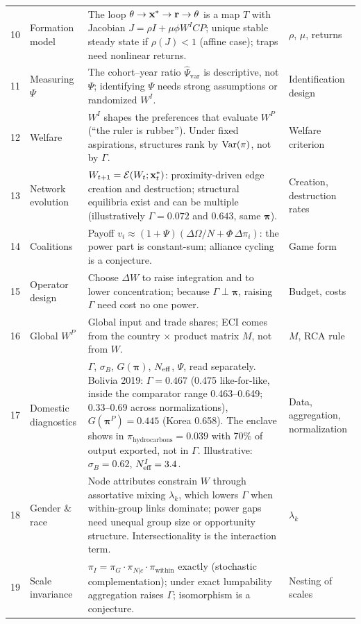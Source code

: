 \documentclass[../structural_economics_book.tex]{subfiles}
\begin{document}
{\begin{longtable}{@{}r>{\raggedright\arraybackslash}p{2.5cm}>{\raggedright\arraybackslash}p{7.6cm}>{\raggedright\arraybackslash}p{3.1cm}@{}}
10 & Formation model & The loop $\theta \to \mathbf{x}^* \to \mathbf{r} \to \theta$ is a map $T$ with Jacobian $J = \rho I + \mu\phi W^I C P$; unique stable steady state if $\rho(J) < 1$ (affine case); traps need nonlinear returns. & $\rho$, $\mu$, returns \\
11 & Measuring $\Psi$ & The cohort--year ratio $\hat{\Psi}_{\text{var}}$ is descriptive, not $\Psi$; identifying $\Psi$ needs strong assumptions or randomized $W^I$. & Identification design \\
12 & Welfare & $W^I$ shapes the preferences that evaluate $W^P$ (``the ruler is rubber''). Under fixed aspirations, structures rank by $\operatorname{Var}(\pi)$, not by $\Gamma$. & Welfare criterion \\
13 & Network evolution & $W_{t+1} = \mathcal{E}(W_t; \mathbf{x}^*_t)$: proximity-driven edge creation and destruction; structural equilibria exist and can be multiple (illustratively $\Gamma = 0.072$ and $0.643$, same $\boldsymbol{\pi}$). & Creation, destruction rates \\
14 & Coalitions & Payoff $v_i \approx (1+\Psi)(\Delta\Omega/N + \Phi\,\Delta\pi_i)$: the power part is constant-sum; alliance cycling is a conjecture. & Game form \\
15 & Operator design & Choose $\Delta W$ to raise integration and to lower concentration; because $\Gamma \perp \boldsymbol{\pi}$, raising $\Gamma$ need cost no one power. & Budget, costs \\
16 & Global $W^P$ & Global input and trade shares; ECI comes from the country $\times$ product matrix $M$, not from $W$. & $M$, RCA rule \\
17 & Domestic diagnostics & $\Gamma$, $\sigma_B$, $G(\boldsymbol{\pi})$, $N_{\text{eff}}$, $\Psi$, read separately. Bolivia 2019: $\Gamma = 0.467$ (0.475 like-for-like, inside the comparator range 0.463--0.649; 0.33--0.69 across normalizations), $G(\boldsymbol{\pi}^P) = 0.445$ (Korea 0.658). The enclave shows in $\pi_{\text{hydrocarbons}} = 0.039$ with 70\% of output exported, not in $\Gamma$. Illustrative: $\sigma_B = 0.62$, $N_{\text{eff}}^I = 3.4$. & Data, aggregation, normalization \\
18 & Gender \& race & Node attributes constrain $W$ through assortative mixing $\lambda_k$, which lowers $\Gamma$ when within-group links dominate; power gaps need unequal group size or opportunity structure. Intersectionality is the interaction term. & $\lambda_k$ \\
19 & Scale invariance & $\pi_I = \pi_G \cdot \pi_{N|c} \cdot \pi_{\text{within}}$ exactly (stochastic complementation); under exact lumpability aggregation raises $\Gamma$; isomorphism is a conjecture. & Nesting of scales \\

\end{longtable}}
\end{document}
